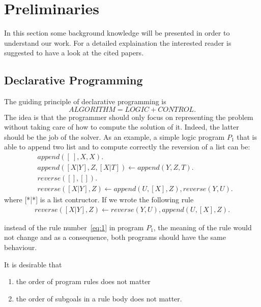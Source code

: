 \section{Preliminaries}
In this section some background knowledge will be presented in order to understand our work. For a detailed explaination the interested reader is suggested to have a look at the cited papers. 
\subsection{Declarative Programming}
The guiding principle of declarative programming is 
\[ALGORITHM = LOGIC + CONTROL.\]
The idea is that the programmer should only focus on representing the problem without taking care of how to compute the solution of it. Indeed, the latter should be the job of the solver. As an example, a simple logic program \(P_1\) that  is able to append two list and to compute correctly the reversion of a list can be: 
\begin{align}
&append ([\:], X, X). \\
&append ([X|Y], Z, [X|T ]) \leftarrow append (Y, Z, T ). \\
&reverse([ ], [ ]).\\
&reverse([X|Y ], Z) \leftarrow append (U, [X], Z), reverse(Y, U ). \label{eq:1}
\end{align}
where [*|*] is a list contructor.
If we wrote the following rule 
\begin{align}
reverse([X|Y ], Z) \leftarrow reverse(Y, U ), append(U, [X], Z). \label{eq:2}
\end{align}

instead of the rule number~\ref{eq:1} in program \(P_1\), the meaning of the rule would not change and as a consequence, both programs should have the same behaviour. 

It is desirable that
\begin{enumerate}
\item the order of program rules does not matter
\item the order of subgoals in a rule body does not matter.
\end{enumerate}

